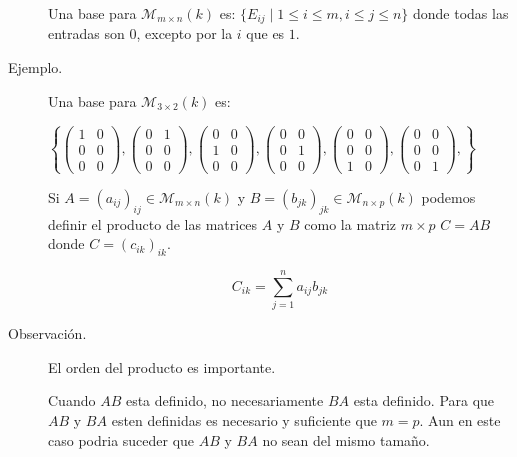 \documentclass[12pt]{article}
\begin{document}
\begin{description}
Una base para $\mathcal{M}_{m \times n}(k)$ es: $\{E_{ij} \mid 1 \le i \le m, i \le j \le n\}$ donde todas las entradas son $0$, excepto por la $i$ que es $1$.

\item [Ejemplo.] Una base para $\mathcal{M}_{3 \times 2}(k)$ es:

\begin{math}
\left\{ 
\begin{pmatrix}
1 & 0 \\
0 & 0 \\
0 & 0
\end{pmatrix},
\begin{pmatrix}
0 & 1 \\
0 & 0 \\
0 & 0
\end{pmatrix},
\begin{pmatrix}
0 & 0 \\
1 & 0 \\
0 & 0
\end{pmatrix},
\begin{pmatrix}
0 & 0 \\
0 & 1 \\
0 & 0
\end{pmatrix},
\begin{pmatrix}
0 & 0 \\
0 & 0 \\
1 & 0
\end{pmatrix},
\begin{pmatrix}
0 & 0 \\
0 & 0 \\
0 & 1
\end{pmatrix},
\right\}
\end{math}

Si $A = (a_{ij})_{ij} \in \mathcal{M}_{m \times n}(k)$ y $B = (b_{jk})_{jk} \in \mathcal{M}_{n \times p}(k)$ podemos definir el producto de las matrices $A$ y $B$ como la matriz $m \times p$ $C = A B$ donde $C = (c_{ik})_{ik}$.

\begin{equation}
C_{ik} = \sum\limits_{j = 1}^n a_{ij} b_{jk}
\end{equation}

\item [Observación.] El orden del producto es importante.

Cuando $A B$ esta definido, no necesariamente $B A$ esta definido. Para que $A B$ y $B A$ esten definidas es necesario y suficiente que $m = p$. Aun en este caso podria suceder que $A B$ y $B A$ no sean del mismo tamaño.


\end{description}
\end{document}
